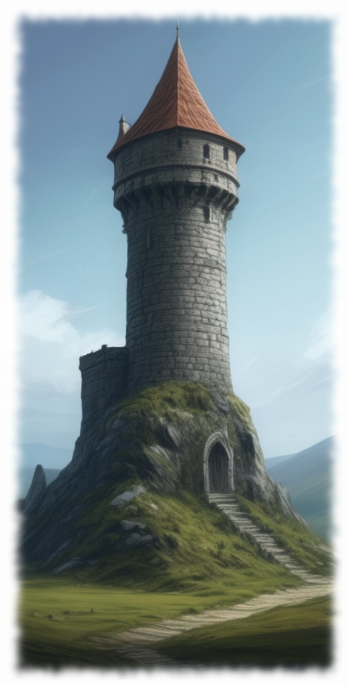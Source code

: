 \begin{figure}[h]
\begin{center}
\includegraphics[scale=0.47]{img/ai-images/tower.png}
\end{center}
\end{figure}

